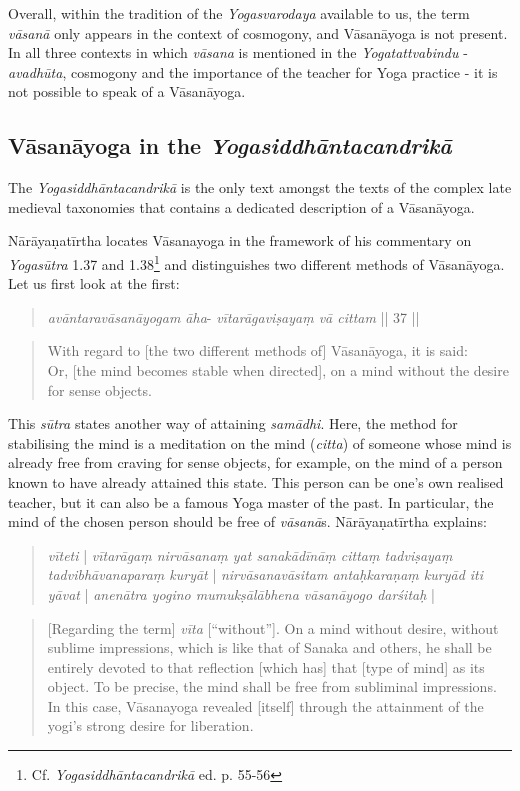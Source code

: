 Overall, within the tradition of the \textit{Yogasvarodaya} available to us, the term \textit{vāsanā} only appears in the context of cosmogony, and Vāsanāyoga is not present. In all three contexts in which \textit{vāsana} is mentioned in the \textit{Yogatattvabindu} - \textit{avadhūta}, cosmogony and the importance of the teacher for Yoga practice - it is not possible to speak of a Vāsanāyoga.

\subsection{Vāsanāyoga in the \textit{Yogasiddhāntacandrikā}}
\label{laksyayogaintrocandrika}  

The \textit{Yogasiddhāntacandrikā} is the only text amongst the texts of the complex late medieval taxonomies that contains a dedicated description of a Vāsanāyoga.

Nārāyaṇatīrtha locates Vāsanayoga in the framework of his commentary on \textit{Yogasūtra} 1.37 and 1.38\footnote{Cf. \textit{Yogasiddhāntacandrikā} ed. p. 55-56} and distinguishes two different methods of Vāsanāyoga. Let us first look at the first:

\begin{quote}
\textit{avāntaravāsanāyogam āha}-
\textit{vītarāgaviṣayaṃ vā cittam} || 37 ||
\end{quote}
\begin{quote}
With regard to [the two different methods of] Vāsanāyoga, it is said: \\
Or, [the mind becomes stable when directed], on a mind without the desire for sense objects. 
\end{quote}

This \textit{sūtra} states another way of attaining \textit{samādhi}. Here, the method for stabilising the mind is a meditation on the mind (\textit{citta}) of someone whose mind is already free from craving for sense objects, for example, on the mind of a person known to have already attained this state. This person can be one's own realised teacher, but it can also be a famous Yoga master of the past. In particular, the mind of the chosen person should be free of \textit{vāsanā}s. Nārāyaṇatīrtha explains:

\begin{quote}
  \textit{vīteti} | \textit{vītarāgaṃ nirvāsanaṃ yat sanakādīnāṃ cittaṃ tadviṣayaṃ tadvibhāvanaparaṃ kuryāt} | \textit{nirvāsanavāsitam antaḥkaraṇaṃ kuryād iti yāvat} | \textit{anenātra yogino mumukṣālābhena vāsanāyogo darśitaḥ} |
\end{quote}
\begin{quote}
[Regarding the term] \textit{vīta} [``without'']. On a mind without desire, without sublime impressions, which is like that of Sanaka and others, he shall be entirely devoted to that reflection [which has] that [type of mind] as its object. To be precise, the mind shall be free from subliminal impressions. In this case, Vāsanayoga revealed [itself] through the attainment of the yogi's strong desire for liberation. 
\end{quote}


